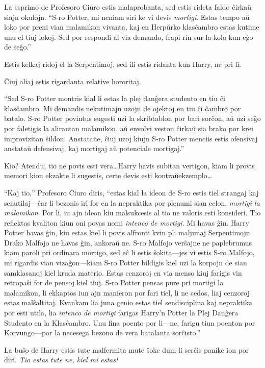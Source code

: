 La esprimo de Profesoro Ciuro estis malaprobanta, sed estis rideta
faldo ĉirkaŭ siajn okulojn. ``S-ro Potter, mi neniam siri ke vi devis
\emph{mortigi}. Estas tempo aŭ loko por preni vian malamikon vivanta,
kaj en Herpŭrko klasĉambro estas kutime unu el tiuj lokoj. Sed por
respondi al via demando, frapi rin sur la kolo kun eĝo de seĝo.''

Estis kelkaj ridoj el la Serpentimoj, sed ili estis ridanta kun Harry,
ne pri li.


Ĉiuj aliaj estis rigardanta relative hororitaj.

``Sed S-ro Potter montris kial li estas la plej danĝera studento en
tiu ĉi klasĉambro. Mi demandis nekutimajn uzojn de ojektoj en tiu ĉi
ĉambro por batalo. S-ro Potter povintus sugesti uzi la skribtablon por
bari sorĉon, aŭ uzi seĝo por faletigis la alirantan malamikon, aŭ
envolvi veston ĉirkaŭ sia brako por krei improvizitan
ŝildon. Anstataŭe, ĉiuj uzoj kiujn S-ro Potter menciis estis ofensivaj
anstataŭ defensivaj, kaj mortigaj aŭ potenciale mortigaj.''

Kio? Atendu, tio ne povis esti vera\ldots Harry havis subitan
vertigon, kiam li provis memori kion ekzakte li sugestis, certe devis
esti kontraŭekzemplo\ldots

``Kaj tio,'' Profesoro Ciuro diris, ``estas kial la ideon de S-ro
estis tiel strangaj kaj senutilaj—ĉar li bezonis iri for en la
nepraktika por plenumi sian celon, \emph{mortigi la malamikon}. Por
li, iu ajn ideon kiu malsukcesis al tio ne valoris esti konsideri. Tio
reflektas kvaliton kiun oni povas nomi \emph{intenco de mortigi}. Mi
havas ĝin. Harry Potter havas ĝin, kiu estas kiel li povis alfronti
kvin pli maljunaj Serpentimojn. Drako Malfojo ne havas ĝin, ankoraŭ
ne. S-ro Malfojo verŝajne ne paplebrumus kiam paroli pri ordinara
mortigo, sed eĉ li estis ŝokita—jes vi estis S-ro Malfojo, mi rigardis
vian vizaĝon—kiam S-ro Potter bildigis kiel uzi la korpojn de sian
samklasanoj kiel kruda materio. Estas cenzoroj en via menso kiuj
farigis vin retropaŝi for de pensoj kiel tiuj. S-ro Potter pensas pure
pri mortigi la malamikon, li ekkaptos iun ajn manieron por fari tiel,
li ne cedos, liaj cenzoroj estas malŝaltitaj. Kvankam lia juna genio
estas tiel sendisciplina kaj nepraktika por esti utila, lia
\emph{intenco de mortigi} farigas Harry'n Potter la Plej Danĝera
Studento en la Klasĉambro. Unu fina poento por li—ne, farigu tiun
poenton por Korvungo—por la necesega bezono de vera batalanta
sorĉisto.''  

La buŝo de Harry estis tute malfermita mute ŝoke dum li serĉis panike
ion por diri. \emph{Tio estas tute ne, kiel mi estas!}

